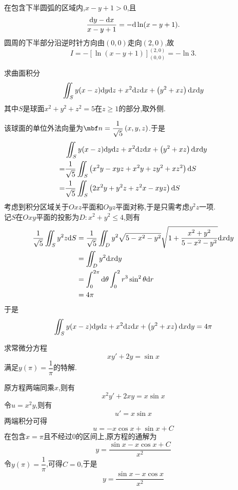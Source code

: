\documentclass{ctexart}
\begin{document}
\begin{solution}
在包含下半圆弧的区域内,$x-y+1>0$,且
    \[\dfrac{\mathrm{d} y-\mathrm{d} x}{x-y+1}=-\mathrm{d}\ln(x-y+1).\]
    圆周的下半部分沿逆时针方向由$(0,0)$走向$(2,0)$,故
    \[I=-\left[\ln(x-y+1)\right]_{(0,0)}^{(2,0)}=-\ln3.\]
\end{solution}
\begin{problem}[4.(15\songti{分})]
    求曲面积分
    \[\iint_Sy(x-z)\mathrm{d} y\mathrm{d} z+x^2\mathrm{d} z\mathrm{d} x+\left(y^2+xz\right)\mathrm{d} x\mathrm{d} y\]
    其中$S$是球面$x^2+y^2+z^2=5$在$z\geqslant 1$的部分,取外侧.
\end{problem}
\begin{solution}
    该球面的单位外法向量为$\mbf n=\dfrac{1}{\sqrt5}\left(x,y,z\right)$.于是
    \[\begin{aligned}
        &\iint_Sy(x-z)\mathrm{d} y\mathrm{d} z+x^2\mathrm{d} z\mathrm{d} x+\left(y^2+xz\right)\mathrm{d} x\mathrm{d} y \\
        =&\dfrac{1}{\sqrt5}\iint_S\left(x^2y-xyz+x^2y+zy^2+xz^2\right)\mathrm{d} S \\
        =&\dfrac{1}{\sqrt5}\iint_S\left(2x^2y+y^2z+z^2x-xyz\right)\mathrm{d} S
    \end{aligned}\]
    考虑到积分区域关于$Oxz$平面和$Oyz$平面对称,于是只需考虑$y^2z$一项.\\
    记$S$在$Oxy$平面的投影为$D:x^2+y^2\leqslant4$,则有
    \[\begin{aligned}
        \dfrac{1}{\sqrt5}\iint_{S}y^2z\mathrm{d} S
        &= \dfrac{1}{\sqrt5}\iint_{D}y^2\sqrt{5-x^2-y^2}\sqrt{1+\dfrac{x^2+y^2}{5-x^2-y^2}}\mathrm{d} x\mathrm{d} y \\
        &= \iint_{D}y^2\mathrm{d} x\mathrm{d} y \\
        &= \int_0^{2\pi}\mathrm{d}\theta\int_0^2 r^3\sin^2\theta\mathrm{d} r \\
        &= 4\pi
    \end{aligned}\]
    于是
    \[\iint_Sy(x-z)\mathrm{d} y\mathrm{d} z+x^2\mathrm{d} z\mathrm{d} x+\left(y^2+xz\right)\mathrm{d} x\mathrm{d} y=4\pi\]

\end{solution}
\begin{problem}[5.(10\songti{分})]
    求常微分方程
    \[xy'+2y=\sin x\]
    满足$y(\pi)=\dfrac1\pi$的特解.
\end{problem}
\begin{solution}
    原方程两端同乘$x$,则有
    \[x^2y'+2xy=x\sin x\]
    令$u=x^2y$,则有
    \[u'=x\sin x\]
    两端积分可得
    \[u=-x\cos x+\sin x+C\]
    在包含$x=\pi$且不经过$0$的区间上,原方程的通解为
    \[y=\dfrac{\sin x-x\cos x+C}{x^2}\]
    令$y(\pi)=\dfrac1\pi$,可得$C=0$,于是
    \[y=\dfrac{\sin x-x\cos x}{x^2}\]
\end{solution}
\end{document}
